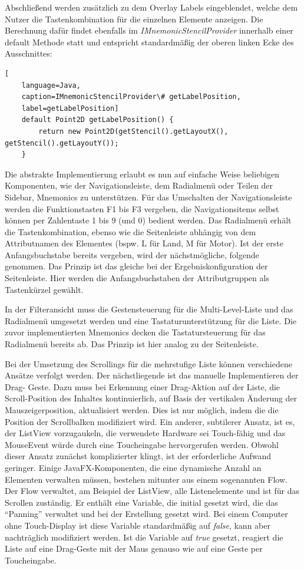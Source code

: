 Abschließend werden zusätzlich zu dem Overlay Labels eingeblendet, welche dem Nutzer die Tastenkombination für die einzelnen Elemente anzeigen. Die Berechnung dafür findet ebenfalls im \textit{IMnemonicStencilProvider} innerhalb einer default Methode statt und entspricht standardmäßig der oberen linken Ecke des Ausschnittes:\par
{}
\begin{lstlisting}[
    language=Java,
    caption=IMnemonicStencilProvider\# getLabelPosition,
    label=getLabelPosition]
    default Point2D getLabelPosition() {
        return new Point2D(getStencil().getLayoutX(), getStencil().getLayoutY());
    }
\end{lstlisting}
\par
Die abstrakte Implementierung erlaubt es nun auf einfache Weise beliebigen Komponenten, wie der Navigationsleiste, dem Radialmenü oder Teilen der Sidebar, Mnemonics zu unterstützen. Für das Umschalten der Navigationsleiste werden die Funktionstasten F1 bis F3 vergeben, die Navigationsitems selbst können per Zahlentaste 1 bis 9 (und 0) bedient werden. Das Radialmenü erhält die Tastenkombination, ebenso wie die Seitenleiste abhängig von dem Attributnamen des Elementes (bspw. L für Land, M für Motor). Ist der erste Anfangsbuchstabe bereits vergeben, wird der nächstmögliche, folgende genommen. Das Prinzip ist das gleiche bei der Ergebniskonfiguration der Seitenleiste. Hier werden die Anfangsbuchstaben der Attributgruppen als Tastenkürzel gewählt.\par
{}
In der Filteransicht muss die Gestensteuerung für die Multi-Level-Liste und das Radialmenü umgesetzt werden und eine Tastaturunterstützung für die Liste. Die zuvor implementierten Mnemonics decken die Tastatursteuerung für das Radialmenü bereits ab. Das Prinzip ist hier analog zu der Seitenleiste. \par
Bei der Umsetzung des Scrollings für die mehrstufige Liste können verschiedene Ansätze verfolgt werden. Der nächstliegende ist das manuelle Implementieren der Drag- Geste. Dazu muss bei Erkennung einer Drag-Aktion auf der Liste, die Scroll-Position des Inhaltes kontinuierlich, auf Basis der vertikalen Änderung der Mauszeigerposition, aktualisiert werden. Dies ist nur möglich, indem die die Position der Scrollbalken modifiziert wird. Ein anderer, subtilerer Ansatz, ist es, der ListView vorzugaukeln, die verwendete Hardware sei Touch-fähig und das MouseEvent würde durch eine Toucheingabe hervorgerufen werden. Obwohl dieser Ansatz zunächst komplizierter klingt, ist der erforderliche Aufwand geringer. Einige JavaFX-Komponenten, die eine dynamische Anzahl an Elementen verwalten müssen, bestehen mitunter aus einem sogenannten Flow. Der Flow verwaltet, am Beispiel der ListView, alle Listenelemente und ist für das Scrollen zuständig. Er enthält eine Variable, die initial gesetzt wird, die das \enquote{Panning} verwaltet und bei der Erstellung gesetzt wird. Bei einem Computer ohne Touch-Display ist diese Variable standardmäßig auf \textit{false}, kann aber nachträglich modifiziert werden. Ist die Variable auf \textit{true} gesetzt, reagiert die Liste auf eine Drag-Geste mit der Maus genauso wie auf eine Geste per Toucheingabe.\par
